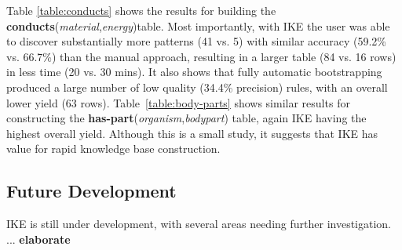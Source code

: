 \documentclass[11pt,letterpaper]{article}
\newcommand{\pred}{\bf}
\begin{document}
Table \ref{table:conducts} shows the results for building the {\pred conducts}({\it material},{\it energy})table. Most importantly, with IKE the user was able to discover substantially more patterns (41 vs. 5) with similar accuracy (59.2\% vs. 66.7\%) than the manual approach, resulting in a larger table (84 vs. 16 rows) in less time (20 vs. 30 mins). It also shows that fully automatic bootstrapping produced a large number of low quality (34.4\% precision) rules, with an overall lower yield (63 rows). 
Table~\ref{table:body-parts} shows similar results for constructing the {\pred has-part}({\it organism},{\it bodypart}) table, again IKE having the highest overall yield.
Although this is a small study, it suggests that IKE has value for rapid knowledge base construction.

\begin{table}[tbh]
\centering
\boldmath
{}
\caption{Avg. query-times with different sized corpora.}
\label{table:query-times}
\end{table}



\subsection{Future Development}

IKE is still under development, with several areas needing further investigation. ...  {\bf elaborate}

\end{document}
